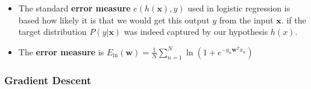 \documentclass[11pt]{article}
\begin{document}
\begin{itemize}
\item The standard \textbf{error measure} \(e(h(\pmb x),y)\) used in logistic regression is based how likely it is that we would get this output \(y\) from the input \(\pmb x\). if the target distribution \(P(y | \pmb x)\) was indeed captured by our hypothesis \(h(x)\).

\item The \textbf{error measure} is \(E_\text{in}(\pmb w) = \frac1N \sum_{n=1}^N\ln(1+e^{-y_n\pmb w^T x_n})\)
\end{itemize}

\subsubsection{Gradient Descent}
\label{sec:org3592f3f}
\end{document}
